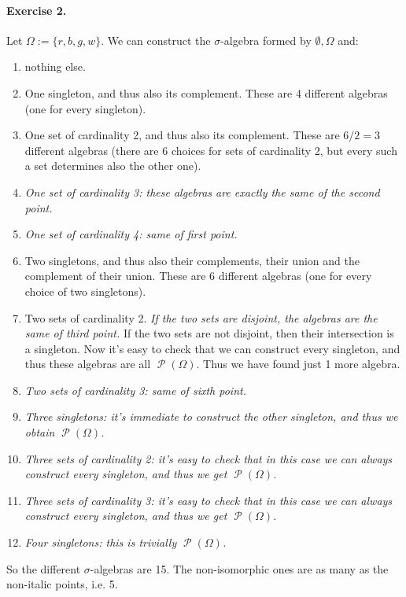 \documentclass[12pt,a4paper]{report}
\theoremstyle{definition}
\theoremstyle{num.custom-title}
\DeclareMathOperator{\PP}{\mathcal{P}}
\renewcommand{\1}{\mathbbm{1}}
\begin{document}
\paragraph{Exercise 2.} Let $\Omega := \{r,b,g,w\}$. We can construct the $\sigma$-algebra formed by $\emptyset,\Omega$ and:
\begin{enumerate}
\item nothing else.
\item One singleton, and thus also its complement. These are 4 different algebras (one for every singleton).
\item One set of cardinality 2, and thus also its complement. These are $6/2=3$ different algebras (there are 6 choices for sets of cardinality 2, but every such a set determines also the other one).
\item \emph{One set of cardinality 3: these algebras are exactly the same of the second point.}
\item \emph{One set of cardinality 4: same of first point.}
\item Two singletons, and thus also their complements, their union and the complement of their union. These are 6 different algebras (one for every choice of two singletons).
\item Two sets of cardinality 2. \emph{If the two sets are disjoint, the algebras are the same of third point.} If the two sets are not disjoint, then their intersection is a singleton. Now it's easy to check that we can construct every singleton, and thus these algebras are all $\PP(\Omega)$. Thus we have found just 1 more algebra.
\item \emph{Two sets of cardinality 3: same of sixth point.}
\item \emph{Three singletons: it's immediate to construct the other singleton, and thus we obtain $\PP(\Omega)$.}
\item \emph{Three sets of cardinality 2: it's easy to check that in this case we can always construct every singleton, and thus we get $\PP(\Omega)$.}
\item \emph{Three sets of cardinality 3: it's easy to check that in this case we can always construct every singleton, and thus we get $\PP(\Omega)$.}
\item \emph{Four singletons: this is trivially $\PP(\Omega)$.}
\end{enumerate}

So the different $\sigma$-algebras are 15. The non-isomorphic ones are as many as the non-italic points, i.e. 5.
\end{document}
